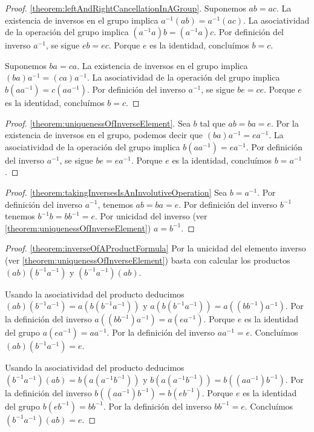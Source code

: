 \documentclass{report}
\theoremstyle{remark}
\begin{document}
  \begin{proof} \ref{theorem:leftAndRightCancellationInAGroup}.
    Suponemos \(a b = a c\).
    La existencia de inversos en el grupo implica \(a^{- 1} (a b) = a^{- 1} (a c)\).
    La asociatividad de la operación del grupo implica \((a^{- 1} a) b = (a^{- 1} a) c\).
    Por definición del inverso \(a^{- 1}\), se sigue \(e b = e c\).
    Porque \(e\) es la identidad, concluímos \(b = c\).

    Suponemos \(b a = c a\).
    La existencia de inversos en el grupo implica \((b a) a^{- 1} = (c a) a^{- 1}\).
    La asociatividad de la operación del grupo implica \(b (a a^{- 1}) = c (a a^{- 1})\).
    Por definición del inverso \(a^{- 1}\), se sigue \(b e = c e\).
    Porque \(e\) es la identidad, concluímos \(b = c\).
  \end{proof}
  \begin{proof} \ref{theorem:uniquenessOfInverseElement}.
    Sea \(b\) tal que \(a b = b a = e\).
    Por la existencia de inversos en el grupo, podemos decir que \((b a) a^{- 1} = e a^{- 1}\).
    La asociatividad de la operación del grupo implica \(b (a a^{- 1}) = e a^{- 1}\).
    Por definición del inverso \(a^{- 1}\), se sigue \(b e = e a^{- 1}\).
    Porque \(e\) es la identidad, concluímos \(b = a^{- 1}\).
  \end{proof}
  \begin{proof} \ref{theorem:takingInversesIsAnInvolutiveOperation}
    Sea \(b = a^{- 1}\).
    Por definición del inverso \(a^{- 1}\), tenemos \(a b = b a = e\).
    Por definición del inverso \(b^{- 1}\) tenemos \(b^{- 1} b = b b^{- 1} = e\).
    Por unicidad del inverso (ver \ref{theorem:uniquenessOfInverseElement}) \(a = b^{- 1}\).
  \end{proof}
  \begin{proof} \ref{theorem:inverseOfAProductFormula}
    Por la unicidad del elemento inverso (ver \ref{theorem:uniquenessOfInverseElement}) basta con calcular los productos \((a b) (b^{ - 1} a^{- 1})\) y \((b^{ - 1} a^{- 1}) (a b)\).

    Usando la asociatividad del producto deducimos
    \(
      (a b) (b^{ - 1} a^{- 1})
      =
      a (b (b^{- 1} a^{- 1}))
    \)
    y
    \(
      a (b (b^{- 1} a^{- 1}))
      =
      a ((b b^{- 1}) a^{- 1})
    \).
    Por la definición del inverso \(a ((b b^{- 1}) a^{- 1}) = a (e a^{- 1})\).
    Porque \(e\) es la identidad del grupo \(a (e a^{- 1}) = a a^{- 1}\).
    Por la definición del inverso \(a a^{- 1} = e\).
    Concluímos \((a b) (b^{-1} a^{- 1}) = e\).

    Usando la asociatividad del producto deducimos
    \(
      (b^{ - 1} a^{- 1}) (a b)
      =
      b (a (a^{- 1} b^{- 1}))
    \)
    y
    \(
      b (a (a^{- 1} b^{- 1}))
      =
      b ((a a^{- 1}) b^{- 1})
    \).
    Por la definición del inverso \(b ((a a^{- 1}) b^{- 1}) = b (e b^{- 1})\).
    Porque \(e\) es la identidad del grupo \(b (e b^{- 1}) = b b^{- 1}\).
    Por la definición del inverso \(b b^{- 1} = e\).
    Concluímos \((b^{-1} a^{- 1}) (a b) = e\).
  \end{proof}
\end{document}
